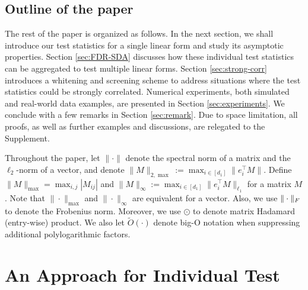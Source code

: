 \documentclass[12pt]{article}
\theoremstyle{plain}
\begin{document}
\begin{sloppypar}
\subsection{Outline of the paper}
The rest of the paper is organized as follows. In the next section, we shall introduce our test statistics for a single linear form and study its asymptotic properties. Section \ref{sec:FDR-SDA} discusses how these individual test statistics can be aggregated to test multiple linear forms. Section \ref{sec:strong-corr} introduces a whitening and screening scheme to address situations where the test statistics could be strongly correlated. Numerical experiments, both simulated and real-world data examples, are presented in Section \ref{sec:experiments}. We conclude with a few remarks in Section \ref{sec:remark}. Due to space limitation, all proofs, as well as further examples and discussions, are relegated to the Supplement.

Throughout the paper, let $\|\cdot\|$ denote the spectral norm of a matrix and the $\ell_2$-norm of a vector, and  denote $\|M\|_{2,\max}:=\max_{i\in [d_1]}\|e_i^{\top}M\|$. Define $\|M\|_{\max}=\max_{i,j}|M_{ij}|$ and $\|M\|_{\infty}:=\max_{i\in[d_1]} \|e_i^{\top} M\|_{\ell_1}$ for a matrix $M$. Note that $\|\cdot\|_{\max}$ and $\|\cdot\|_{\infty}$ are equivalent for a vector. Also, we use $\|\cdot\|_{\rm F}$ to denote the Frobenius norm. Moreover, we use $\odot$ to denote matrix Hadamard (entry-wise) product. We also let $\widetilde{O}(\cdot)$ denote big-O notation when suppressing additional polylogarithmic factors.


\section{An Approach for Individual Test}\label{sec:clt}


\end{sloppypar}
\end{document}
